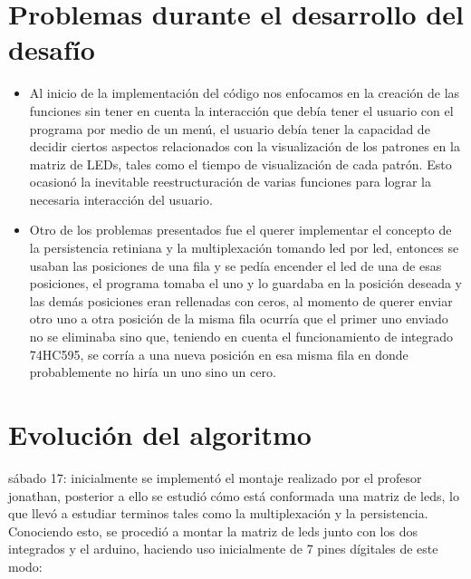 \documentclass{article}
\begin{document}
\section{Problemas durante el desarrollo del desafío}
\begin{itemize}

\item Al inicio de la implementación del código nos enfocamos en la creación de las funciones sin tener en cuenta la interacción que debía tener el usuario con el programa por medio de un menú, el usuario debía tener la capacidad de decidir ciertos aspectos relacionados con la visualización de los patrones en la matriz de LEDs, tales como el tiempo de visualización de cada patrón. Esto ocasionó la inevitable reestructuración de varias funciones para lograr la necesaria interacción del usuario.
\item Otro de los problemas presentados fue el querer implementar el concepto de la persistencia retiniana y la multiplexación tomando led por led, entonces se usaban las posiciones de una fila y se pedía encender el led de una de esas posiciones, el programa tomaba el uno y lo guardaba en la posición deseada y las demás posiciones eran rellenadas con ceros, al momento de querer enviar otro uno a otra posición de la misma fila ocurría que el primer uno enviado no se eliminaba sino que, teniendo en cuenta el funcionamiento de integrado 74HC595, se corría a una nueva posición en esa misma fila en donde probablemente no hiría un uno sino un cero.
\end{itemize}
\label{imagenes}
\section{Evolución del algoritmo} \label{imagenes}
sábado 17: inicialmente se implementó el montaje realizado por el profesor jonathan, posterior a ello se estudió cómo está conformada una matriz de leds, lo que llevó a estudiar terminos tales como la multiplexación y la persistencia. Conociendo esto, se procedió a montar la matriz de leds junto con los dos integrados y el arduino, haciendo uso inicialmente de 7 pines dígitales de este modo:
\end{document}
